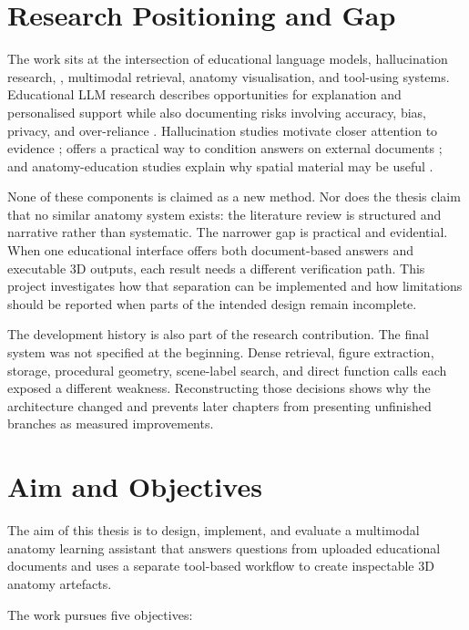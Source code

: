 \section{Research Positioning and Gap}
\label{sec:introduction-gap}

The work sits at the intersection of educational language models, hallucination research, \RAG{}, multimodal retrieval, anatomy visualisation, and tool-using systems. Educational LLM research describes opportunities for explanation and personalised support while also documenting risks involving accuracy, bias, privacy, and over-reliance \parencite{kasneci2023}. Hallucination studies motivate closer attention to evidence \parencite{ji2023}; \RAG{} offers a practical way to condition answers on external documents \parencite{lewis2020}; and anatomy-education studies explain why spatial material may be useful \parencite{yammine2015,moro2017}.

None of these components is claimed as a new method. Nor does the thesis claim that no similar anatomy system exists: the literature review is structured and narrative rather than systematic. The narrower gap is practical and evidential. When one educational interface offers both document-based answers and executable 3D outputs, each result needs a different verification path. This project investigates how that separation can be implemented and how limitations should be reported when parts of the intended design remain incomplete.

The development history is also part of the research contribution. The final system was not specified at the beginning. Dense retrieval, figure extraction, storage, procedural geometry, scene-label search, and direct function calls each exposed a different weakness. Reconstructing those decisions shows why the architecture changed and prevents later chapters from presenting unfinished branches as measured improvements.

\section{Aim and Objectives}
\label{sec:introduction-aim-objectives}

The aim of this thesis is to design, implement, and evaluate a multimodal anatomy learning assistant that answers questions from uploaded educational documents and uses a separate tool-based workflow to create inspectable 3D anatomy artefacts.

The work pursues five objectives:

